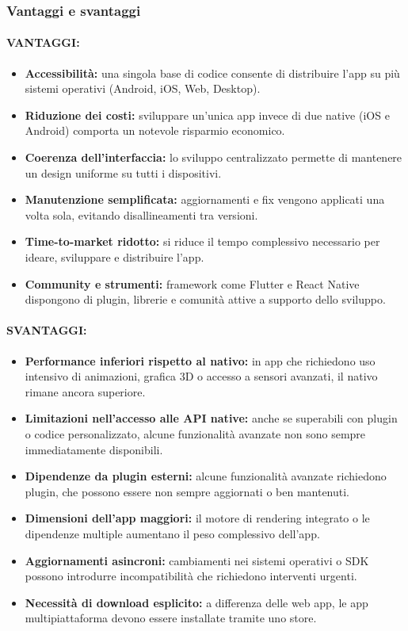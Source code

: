 \subsubsection{Vantaggi e svantaggi}

\paragraph{VANTAGGI:}

\begin{itemize}
  \item \textbf{Accessibilità:} una singola base di codice consente di distribuire l'app su più sistemi operativi (Android, iOS, Web, Desktop).
  \item \textbf{Riduzione dei costi:} sviluppare un’unica app invece di due native (iOS e Android) comporta un notevole risparmio economico.
  \item \textbf{Coerenza dell’interfaccia:} lo sviluppo centralizzato permette di mantenere un design uniforme su tutti i dispositivi.
  \item \textbf{Manutenzione semplificata:} aggiornamenti e fix vengono applicati una volta sola, evitando disallineamenti tra versioni.
  \item \textbf{Time-to-market ridotto:} si riduce il tempo complessivo necessario per ideare, sviluppare e distribuire l’app.
  \item \textbf{Community e strumenti:} framework come Flutter e React Native dispongono di plugin, librerie e comunità attive a supporto dello sviluppo.
\end{itemize}

\paragraph{SVANTAGGI:}

\begin{itemize}
  \item \textbf{Performance inferiori rispetto al nativo:} in app che richiedono uso intensivo di animazioni, grafica 3D o accesso a sensori avanzati, il nativo rimane ancora superiore.
  \item \textbf{Limitazioni nell’accesso alle API native:} anche se superabili con plugin o codice personalizzato, alcune funzionalità avanzate non sono sempre immediatamente disponibili.
  \item \textbf{Dipendenze da plugin esterni:} alcune funzionalità avanzate richiedono plugin, che possono essere non sempre aggiornati o ben mantenuti.
  \item \textbf{Dimensioni dell'app maggiori:} il motore di rendering integrato o le dipendenze multiple aumentano il peso complessivo dell’app.
  \item \textbf{Aggiornamenti asincroni:} cambiamenti nei sistemi operativi o SDK possono introdurre incompatibilità che richiedono interventi urgenti.
  \item \textbf{Necessità di download esplicito:} a differenza delle web app, le app multipiattaforma devono essere installate tramite uno store.
\end{itemize}

